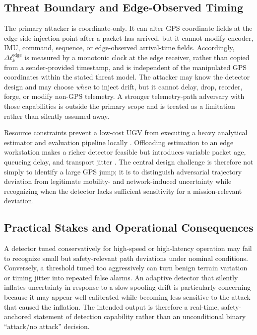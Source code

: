 \documentclass[11pt,a4paper]{article}
\begin{document}
\subsection{Threat Boundary and Edge-Observed Timing}
The primary attacker is coordinate-only. It can alter GPS coordinate fields at the edge-side injection point after a packet has arrived, but it cannot modify encoder, IMU, command, sequence, or edge-observed arrival-time fields. Accordingly, $\Delta t_k^{\mathrm{edge}}$ is measured by a monotonic clock at the edge receiver, rather than copied from a sender-provided timestamp, and is independent of the manipulated GPS coordinates within the stated threat model. The attacker may know the detector design and may choose \emph{when} to inject drift, but it cannot delay, drop, reorder, forge, or modify non-GPS telemetry. A stronger telemetry-path adversary with those capabilities is outside the primary scope and is treated as a limitation rather than silently assumed away.

Resource constraints prevent a low-cost UGV from executing a heavy analytical estimator and evaluation pipeline locally \cite{ref7,ref16}. Offloading estimation to an edge workstation makes a richer detector feasible but introduces variable packet age, queueing delay, and transport jitter \cite{ref61}. The central design challenge is therefore not simply to identify a large GPS jump; it is to distinguish adversarial trajectory deviation from legitimate mobility- and network-induced uncertainty while recognizing when the detector lacks sufficient sensitivity for a mission-relevant deviation.

\subsection{Practical Stakes and Operational Consequences}
A detector tuned conservatively for high-speed or high-latency operation may fail to recognize small but safety-relevant path deviations under nominal conditions. Conversely, a threshold tuned too aggressively can turn benign terrain variation or timing jitter into repeated false alarms. An adaptive detector that silently inflates uncertainty in response to a slow spoofing drift is particularly concerning because it may appear well calibrated while becoming less sensitive to the attack that caused the inflation. The intended output is therefore a real-time, safety-anchored statement of detection capability rather than an unconditional binary ``attack/no attack'' decision.
\end{document}

